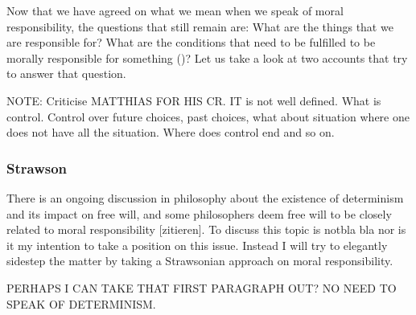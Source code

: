\documentclass{article}
\begin{document}

Now that we have agreed on what we mean when we speak of moral responsibility,
the questions that still remain are: What are the things that we are responsible
for? What are the conditions that need to be fulfilled to be morally responsible
for something (\cite[p. 370]{smith2008control})? Let us take a look at two
accounts that try to answer that question.


NOTE: Criticise MATTHIAS FOR HIS CR. IT is not well defined. What is control. Control
over future choices, past choices, what about situation where one does not have
all the situation. Where does control end and so on.



%
%
%

\subsubsection{Strawson}

There is an ongoing discussion in philosophy about the existence of determinism
and its impact on free will, and some philosophers deem free will to be closely related to
moral responsibility [zitieren]. To discuss this topic is notbla bla nor is it
my intention to take a position on this issue. Instead I will try to elegantly
sidestep the matter by taking a Strawsonian approach on moral responsibility.

PERHAPS I CAN TAKE THAT FIRST PARAGRAPH OUT? NO NEED TO SPEAK OF DETERMINISM.
\end{document}
